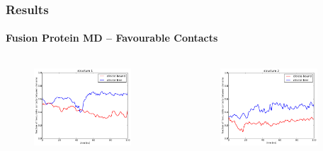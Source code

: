 \documentclass[english]{beamer}
\begin{document}

\begin{frame}
    \frametitle{Results}
    \framesubtitle{Fusion Protein MD -- Favourable Contacts}  

    \vspace{0.06\topmargin}

    \begin{columns}[t]
        \vspace{-4ex}
        \begin{figure}
            \includegraphics[width=0.85\textwidth]{figures/Complex_hydrophobic_core/favourable_cont_structure1.pdf}  
        \end{figure}      
        \vspace{-5ex}
        \begin{figure}
            \includegraphics[width=0.85\textwidth]{figures/Complex_hydrophobic_core/favourable_cont_structure3.pdf}  
        \end{figure}       


\end{columns}
\end{frame}
\end{document}
